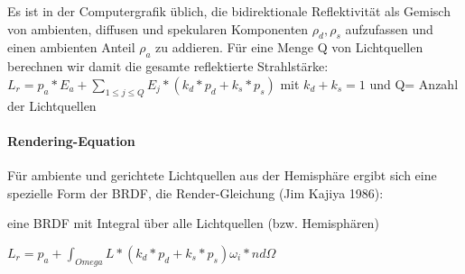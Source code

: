 \documentclass[landscape]{article}
\begin{document}
\begin{multicols}{3}
  Es ist in der Computergrafik üblich, die bidirektionale Reflektivität als Gemisch von ambienten, diffusen und spekularen Komponenten $\rho_d, \rho_s$ aufzufassen und
  einen ambienten Anteil $\rho_a$ zu addieren. Für eine Menge Q von Lichtquellen berechnen wir damit die gesamte reflektierte Strahlstärke: $L_r=p_a*E_a+\sum_{1\leq j \leq Q} E_j * (k_d*p_d + k_s*p_s)$ mit $k_d+k_s=1$ und Q= Anzahl der Lichtquellen
  
  \paragraph{Rendering-Equation}
  Für ambiente und gerichtete Lichtquellen aus der Hemisphäre ergibt sich eine spezielle Form der BRDF, die Render-Gleichung (Jim Kajiya 1986):
  \begin{itemize*}
    \item eine BRDF mit Integral über alle Lichtquellen (bzw. Hemisphären)
    \item $L_r=p_a + \int_{Omega} L*(k_d*p_d+k_s*p_s) \omega_i*n d\Omega$
  \end{itemize*}
  
  

\end{multicols}
\end{document}
